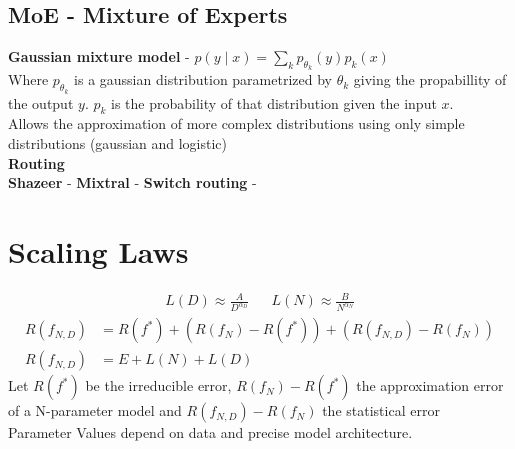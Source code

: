 \begin{multicols}{2}
    \begin{mdframed}[style=eqbox]
        \subsection{MoE - Mixture of Experts}
        \textbf{Gaussian mixture model} - $p(y \mid x) = \sum_k p_{\theta_k}(y) p_k(x)$\\
        Where $p_{\theta_k}$ is a gaussian distribution parametrized by $\theta_k$ giving the propabillity of the output $y$. $p_k$ is the probability of that distribution given the input $x$.\\
        Allows the approximation of more complex distributions using only simple distributions (gaussian and logistic)\\[0.5em]
        \textbf{Routing}\\
        \textbf{Shazeer} -
        \textbf{Mixtral} -
        \textbf{Switch routing} -
    \end{mdframed}

    \section{Scaling Laws}
    \begin{mdframed}[style=eqbox]
        \begin{align*}
            L(D) \approx \frac{A}{D^{\alpha_D}} && L(N) \approx \frac{B}{N^{\alpha_N}}
        \end{align*}\vspace{-2em}
        \begin{align*}
            R(f_{N,D}) &= R(f^*) + (R(f_N) - R(f^*)) + (R(f_{N,D}) - R(f_N))\\
            R(f_{N,D}) &= E + L(N) + L(D)
        \end{align*}
        {\small
        Let $R(f^*)$ be the irreducible error, $R(f_N) - R(f^*)$ the approximation error of a N-parameter model and $R(f_{N,D}) - R(f_N)$ the statistical error\\
        Parameter Values depend on data and precise model architecture.
        }

\end{mdframed}
\end{multicols}
